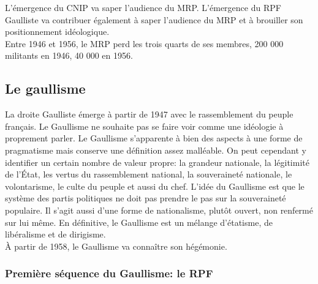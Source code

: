 \documentclass[10pt, a4paper, openany]{book}
\begin{document}
L'émergence du CNIP va saper l'audience du MRP. L'émergence du RPF Gaulliste va contribuer également à saper l'audience du MRP et à brouiller son positionnement idéologique. \\
Entre 1946 et 1956, le MRP perd les trois quarts de ses membres, 200 000 militants en 1946, 40 000 en 1956.

\subsection{Le gaullisme}

La droite Gaulliste émerge à partir de 1947 avec le rassemblement du peuple français. Le Gaullisme ne souhaite pas se faire voir comme une idéologie à proprement parler. Le Gaullisme s'apparente à bien des aspects à une forme de pragmatisme mais conserve une définition assez malléable. On peut cependant y identifier un certain nombre de valeur propre: la grandeur nationale, la légitimité de l'État, les vertus du rassemblement national, la souveraineté nationale, le volontarisme, le culte du peuple et aussi du chef. L'idée du Gaullisme est que le système des partis politiques ne doit pas prendre le pas sur la souveraineté populaire. Il s'agit aussi d'une forme de nationalisme, plutôt ouvert, non renfermé sur lui même. En définitive, le Gaullisme est un mélange d'étatisme, de libéralisme et de dirigisme. \\
À partir de 1958, le Gaullisme va connaître son hégémonie. 

\subsubsection{Première séquence du Gaullisme: le RPF}
\end{document}
